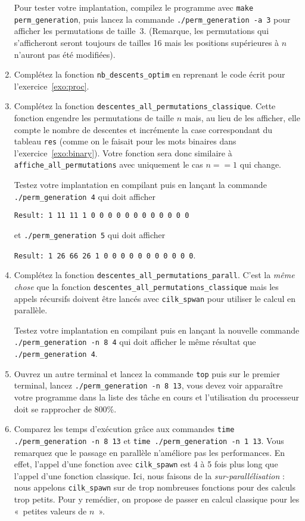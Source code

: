 \documentclass{cours}
\newcommand{\lsti}[1]{\lstinline{#1}{}}
\begin{document}
\begin{exercice}
\begin{enumerate}
Pour tester votre implantation, compilez le programme avec \lsti{make perm_generation}, puis lancez la commande \lsti{./perm_generation -a 3} pour afficher les permutations de taille~3. (Remarque, les permutations qui s'afficheront seront toujours de tailles 16 mais les positions supérieures à $n$ n'auront pas été modifiées).

\item Complétez la fonction \lsti{nb_descents_optim} en reprenant le code écrit pour l'exercice~\ref{exo:proc}.

\item Complétez la fonction \lsti{descentes_all_permutations_classique}. Cette fonction engendre les permutations de taille $n$ mais, au lieu de les afficher, elle compte le nombre de descentes et incrémente la case correspondant du tableau \lsti{res} (comme on le faisait pour les mots binaires dans l'exercice~\ref{exo:binary}). Votre fonction sera donc similaire à \lsti{affiche_all_permutations} avec uniquement le cas $n==1$ qui change.

Testez votre implantation en compilant puis en lançant la commande \lsti{./perm_generation 4} qui doit afficher

\lsti{Result: 1 11 11 1 0 0 0 0 0 0 0 0 0 0 0 0}

et \lsti{./perm_generation 5} qui doit afficher 

\lsti{Result: 1 26 66 26 1 0 0 0 0 0 0 0 0 0 0 0}.

\item Complétez la fonction \lsti{descentes_all_permutations_parall}. C'est la
  \textit{même chose} que la fonction \lsti{descentes_all_permutations_classique} mais les appels récursifs doivent être lancés avec \lsti{cilk_spwan} pour utiliser le calcul en parallèle. 

Testez votre implantation en compilant puis en lançant la nouvelle commande \lsti{./perm_generation -n 8 4} qui doit afficher le même résultat que \lsti{./perm_generation 4}.

\item Ouvrez un autre terminal et lancez la commande \lsti{top} puis sur le premier terminal, lancez \lsti{./perm_generation -n 8 13}, vous devez voir apparaître votre programme dans la liste des tâche en cours et l'utilisation du processeur doit se rapprocher de 800\%.

\item Comparez les temps d'exécution grâce aux commandes \lsti{time ./perm_generation -n 8 13} et \lsti{time ./perm_generation -n 1 13}. Vous remarquez que le passage en parallèle n'améliore pas les performances. En effet, l'appel d'une fonction avec \lsti{cilk_spawn} est 4  à 5 fois plus long que l'appel d'une fonction classique. Ici, nous faisons de la \textit{sur-parallélisation} : nous appelons \lsti{cilk_spawn} sur de trop nombreuses fonctions pour des calculs trop petits. Pour y remédier, on propose de passer en calcul classique pour les «~petites valeurs de $n$~». 


\end{enumerate}
\end{exercice}
\end{document}
